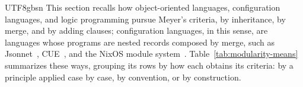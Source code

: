 \begin{CJK*}{UTF8}{gbsn}
\else
This section recalls how object-oriented languages, configuration languages, and logic programming
pursue Meyer's criteria, by inheritance, by merge, and by adding clauses; configuration languages, in
this sense, are languages whose programs are nested records composed by merge, such as
Jsonnet~\cite{cunningham2014-jsonnet}, CUE~\cite{van-lohuizen2019-cue}, and the NixOS module
system~\cite{nixos-contributors-nixos-modules}.
Table~\ref{tab:modularity-means} summarizes these ways, grouping its rows by how each obtains its
criteria: by a principle applied case by case, by convention, or by construction.
\fi


\end{CJK*}
